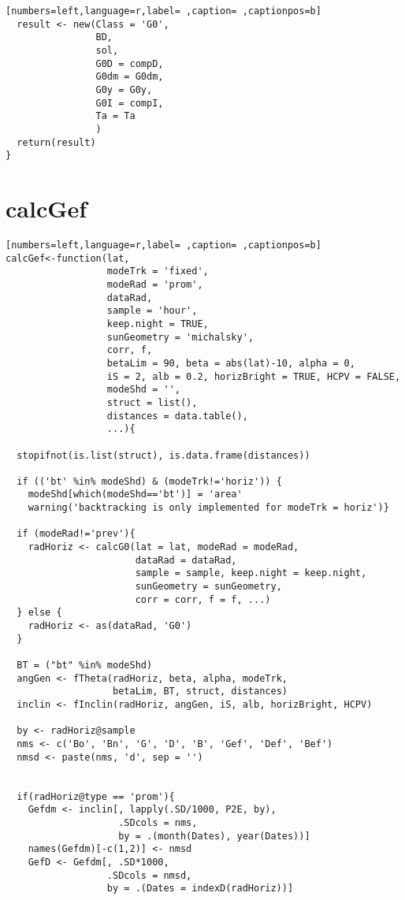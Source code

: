 \begin{lstlisting}[numbers=left,language=r,label= ,caption= ,captionpos=b]
  result <- new(Class = 'G0',
                BD,        
                sol,       
                G0D = compD, 
                G0dm = G0dm, 
                G0y = G0y,   
                G0I = compI, 
                Ta = Ta      
                )
  return(result)
}
\end{lstlisting}
\section{calcGef}
\label{sec:org622ebc9}
\begin{lstlisting}[numbers=left,language=r,label= ,caption= ,captionpos=b]
calcGef<-function(lat,
                  modeTrk = 'fixed',      
                  modeRad = 'prom', 
                  dataRad,
                  sample = 'hour',
                  keep.night = TRUE,
                  sunGeometry = 'michalsky',
                  corr, f,
                  betaLim = 90, beta = abs(lat)-10, alpha = 0,
                  iS = 2, alb = 0.2, horizBright = TRUE, HCPV = FALSE,
                  modeShd = '',    
                  struct = list(), 
                  distances = data.table(),
                  ...){
  
  stopifnot(is.list(struct), is.data.frame(distances))
  
  if (('bt' %in% modeShd) & (modeTrk!='horiz')) {
    modeShd[which(modeShd=='bt')] = 'area'
    warning('backtracking is only implemented for modeTrk = horiz')}
  
  if (modeRad!='prev'){ 
    radHoriz <- calcG0(lat = lat, modeRad = modeRad,
                       dataRad = dataRad,
                       sample = sample, keep.night = keep.night,
                       sunGeometry = sunGeometry,
                       corr = corr, f = f, ...)
  } else {                          
    radHoriz <- as(dataRad, 'G0') 
  } 
  
  BT = ("bt" %in% modeShd) 
  angGen <- fTheta(radHoriz, beta, alpha, modeTrk,
                   betaLim, BT, struct, distances)
  inclin <- fInclin(radHoriz, angGen, iS, alb, horizBright, HCPV)
  
  by <- radHoriz@sample
  nms <- c('Bo', 'Bn', 'G', 'D', 'B', 'Gef', 'Def', 'Bef')
  nmsd <- paste(nms, 'd', sep = '')

  
  if(radHoriz@type == 'prom'){
    Gefdm <- inclin[, lapply(.SD/1000, P2E, by),
                    .SDcols = nms,
                    by = .(month(Dates), year(Dates))]
    names(Gefdm)[-c(1,2)] <- nmsd
    GefD <- Gefdm[, .SD*1000,
                  .SDcols = nmsd,
                  by = .(Dates = indexD(radHoriz))]
    

\end{lstlisting}
